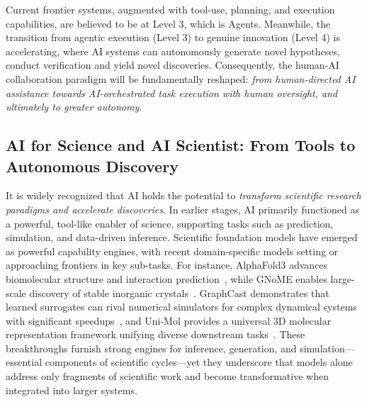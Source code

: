\documentclass[11pt, a4paper, logo, copyright, nonumbering]{SAI}
\begin{document}
Current frontier systems, augmented with tool-use, planning, and execution capabilities, are believed to be at Level 3, which is Agents. Meanwhile, the transition from agentic execution (Level 3) to genuine innovation (Level 4) is accelerating, where AI systems can autonomously generate novel hypotheses, conduct verification and yield novel discoveries. Consequently, the human-AI collaboration paradigm will be fundamentally reshaped: \emph{from human-directed AI assistance towards AI-orchestrated task execution with human oversight, and ultimately to greater autonomy}.

\subsection{AI for Science and AI Scientist: From Tools to Autonomous Discovery}

It is widely recognized that AI holds the potential to \emph{transform scientific research paradigms and accelerate discoveries}. In earlier stages, AI primarily functioned as a powerful, tool-like enabler of science, supporting tasks such as prediction, simulation, and data-driven inference. Scientific foundation models have emerged as powerful capability engines, with recent domain-specific models setting or approaching frontiers in key sub-tasks. For instance, AlphaFold3 advances biomolecular structure and interaction prediction~\cite{abramson2024alphafold3}, while GNoME enables large-scale discovery of stable inorganic crystals~\cite{merchant2023gnome}. GraphCast demonstrates that learned surrogates can rival numerical simulators for complex dynamical systems with significant speedups~\cite{lam2023graphcast}, and Uni-Mol provides a universal 3D molecular representation framework unifying diverse downstream tasks~\cite{zhou2023unimol}. These breakthroughs furnish strong engines for inference, generation, and simulation—essential components of scientific cycles—yet they underscore that models alone address only fragments of scientific work and become transformative when integrated into larger systems.
\end{document}
